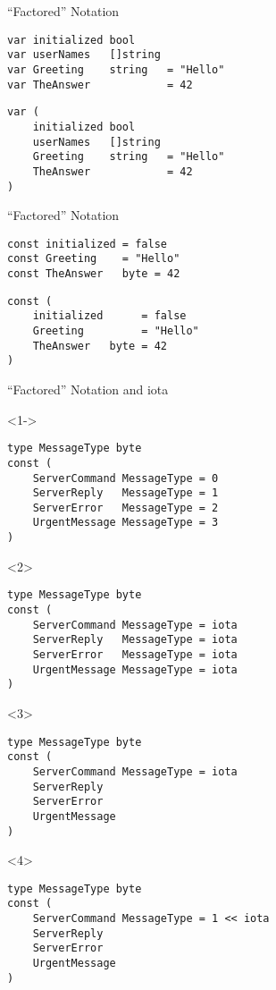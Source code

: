 \documentclass[pdf]{beamer}
\begin{document}
\begin{frame}[fragile]{``Factored'' Notation}
\begin{lstlisting}
var initialized bool
var userNames   []string
var Greeting    string   = "Hello"
var TheAnswer            = 42
\end{lstlisting}
\begin{lstlisting}
var (
    initialized bool
    userNames   []string
    Greeting    string   = "Hello"
    TheAnswer            = 42
)
\end{lstlisting}
\end{frame}

\begin{frame}[fragile]{``Factored'' Notation}
\begin{lstlisting}
const initialized = false
const Greeting    = "Hello"
const TheAnswer   byte = 42
\end{lstlisting}
\begin{lstlisting}
const (
    initialized      = false
    Greeting         = "Hello"
    TheAnswer   byte = 42
)
\end{lstlisting}
\end{frame}

\begin{frame}[fragile]{``Factored'' Notation and iota}
\begin{onlyenv}<1->
\begin{lstlisting}
type MessageType byte
const (
    ServerCommand MessageType = 0
    ServerReply   MessageType = 1
    ServerError   MessageType = 2
    UrgentMessage MessageType = 3
)
\end{lstlisting}
\end{onlyenv}
\vfill\strut
\begin{onlyenv}<2>
\begin{lstlisting}
type MessageType byte
const (
    ServerCommand MessageType = iota
    ServerReply   MessageType = iota
    ServerError   MessageType = iota
    UrgentMessage MessageType = iota
)
\end{lstlisting}
\end{onlyenv}
\begin{onlyenv}<3>
\begin{lstlisting}
type MessageType byte
const (
    ServerCommand MessageType = iota
    ServerReply   
    ServerError   
    UrgentMessage 
)
\end{lstlisting}
\end{onlyenv}
\begin{onlyenv}<4>
\begin{lstlisting}
type MessageType byte
const (
    ServerCommand MessageType = 1 << iota
    ServerReply   
    ServerError   
    UrgentMessage 
)
\end{lstlisting}
\end{onlyenv}
\end{frame}
\end{document}
